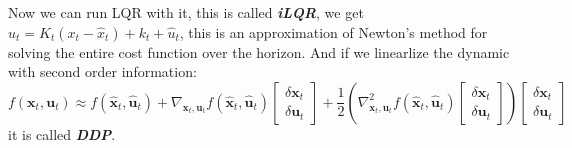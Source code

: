 \documentclass[10pt]{elegantbook}
\newcommand{\mydefination}[1]{\textbf{\textit{\textcolor{structurecolor}{#1}}}}
\begin{document}
Now we can run LQR with it, this is called \mydefination{iLQR}, we get $u_t = K_t(x_t - \hat x_t) + k_t + \hat u_t$, 
this is an approximation of Newton's method for solving the entire cost function over the horizon.
And if we linearlize the dynamic with second order information:
\[
f(\mathbf{x}_t, \mathbf{u}_t) \approx f(\hat{\mathbf{x}}_t, \hat{\mathbf{u}}_t) + \nabla_{\mathbf{x}_t, \mathbf{u}_t} f(\hat{\mathbf{x}}_t, \hat{\mathbf{u}}_t)
\begin{bmatrix}
\delta \mathbf{x}_t \\
\delta \mathbf{u}_t
\end{bmatrix}
+\frac{1}{2} \left ( \nabla_{\mathbf{x}_t, \mathbf{u}_t}^2 f(\hat{\mathbf{x}}_t, \hat{\mathbf{u}}_t) \begin{bmatrix}
\delta \mathbf{x}_t \\
\delta \mathbf{u}_t
\end{bmatrix} \right ) 
\begin{bmatrix}
\delta \mathbf{x}_t \\
\delta \mathbf{u}_t
\end{bmatrix}
\]
it is called \mydefination{DDP}.
\end{document}
